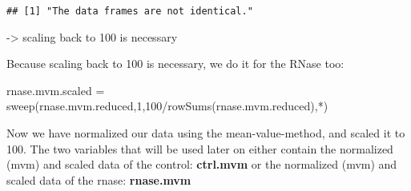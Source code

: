 \documentclass[
]{article}
\newenvironment{Shaded}{\begin{snugshade}}{\end{snugshade}}
\newcommand{\DecValTok}[1]{\textcolor[rgb]{0.00,0.00,0.81}{#1}}
\newcommand{\FunctionTok}[1]{\textcolor[rgb]{0.00,0.00,0.00}{#1}}
\newcommand{\NormalTok}[1]{#1}
\newcommand{\OtherTok}[1]{\textcolor[rgb]{0.56,0.35,0.01}{#1}}
\newcommand{\SpecialCharTok}[1]{\textcolor[rgb]{0.00,0.00,0.00}{#1}}
\newcommand{\StringTok}[1]{\textcolor[rgb]{0.31,0.60,0.02}{#1}}
\begin{document}
\begin{verbatim}
## [1] "The data frames are not identical."
\end{verbatim}

-\textgreater{} scaling back to 100 is necessary

Because scaling back to 100 is necessary, we do it for the RNase too:

\begin{Shaded}
\begin{Highlighting}[]
\NormalTok{rnase.mvm.scaled }\OtherTok{=} 
  \FunctionTok{sweep}\NormalTok{(rnase.mvm.reduced,}\DecValTok{1}\NormalTok{,}\DecValTok{100}\SpecialCharTok{/}\FunctionTok{rowSums}\NormalTok{(rnase.mvm.reduced),}\StringTok{\textquotesingle{}*\textquotesingle{}}\NormalTok{)}
\end{Highlighting}
\end{Shaded}

Now we have normalized our data using the mean-value-method, and scaled
it to 100. The two variables that will be used later on either contain
the normalized (mvm) and scaled data of the control: \textbf{ctrl.mvm}
or the normalized (mvm) and scaled data of the rnase: \textbf{rnase.mvm}
\end{document}
